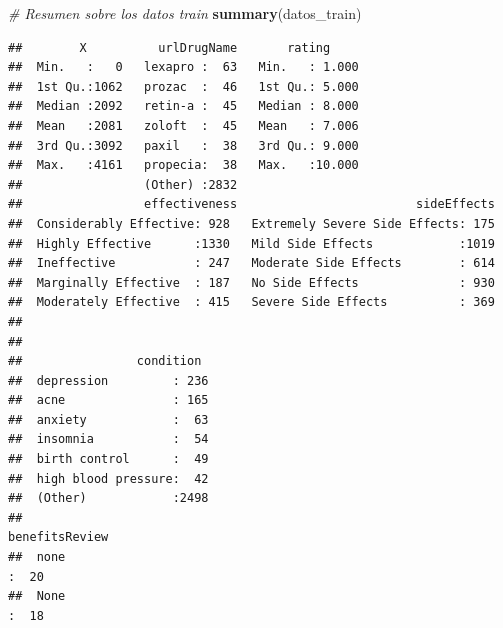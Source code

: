\documentclass[spanish,]{article}
\newenvironment{Shaded}{\begin{snugshade}}{\end{snugshade}}
\newcommand{\CommentTok}[1]{\textcolor[rgb]{0.56,0.35,0.01}{\textit{#1}}}
\newcommand{\KeywordTok}[1]{\textcolor[rgb]{0.13,0.29,0.53}{\textbf{#1}}}
\newcommand{\NormalTok}[1]{#1}
\begin{document}
\begin{Shaded}
\begin{Highlighting}[]
\CommentTok{# Resumen sobre los datos train}
\KeywordTok{summary}\NormalTok{(datos_train) }
\end{Highlighting}
\end{Shaded}

\begin{verbatim}
##        X          urlDrugName       rating      
##  Min.   :   0   lexapro :  63   Min.   : 1.000  
##  1st Qu.:1062   prozac  :  46   1st Qu.: 5.000  
##  Median :2092   retin-a :  45   Median : 8.000  
##  Mean   :2081   zoloft  :  45   Mean   : 7.006  
##  3rd Qu.:3092   paxil   :  38   3rd Qu.: 9.000  
##  Max.   :4161   propecia:  38   Max.   :10.000  
##                 (Other) :2832                   
##                 effectiveness                         sideEffects  
##  Considerably Effective: 928   Extremely Severe Side Effects: 175  
##  Highly Effective      :1330   Mild Side Effects            :1019  
##  Ineffective           : 247   Moderate Side Effects        : 614  
##  Marginally Effective  : 187   No Side Effects              : 930  
##  Moderately Effective  : 415   Severe Side Effects          : 369  
##                                                                    
##                                                                    
##                condition   
##  depression         : 236  
##  acne               : 165  
##  anxiety            :  63  
##  insomnia           :  54  
##  birth control      :  49  
##  high blood pressure:  42  
##  (Other)            :2498  
##                                                                                                                                                                                                                                                                                                                          benefitsReview
##  none                                                                                                                                                                                                                                                                                                                           :  20  
##  None                                                                                                                                                                                                                                                                                                                           :  18  

\end{verbatim}
\end{document}
